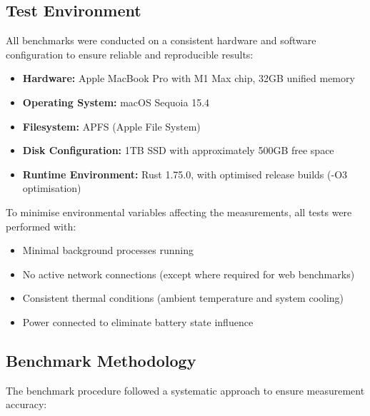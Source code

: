 \subsection{Test Environment}
\label{result:benchmark_on_local_environment:test_environment}

All benchmarks were conducted on a consistent hardware and software configuration to ensure reliable and reproducible results:

\begin{itemize}
  \item \textbf{Hardware:} Apple MacBook Pro with M1 Max chip, 32GB unified memory
  \item \textbf{Operating System:} macOS Sequoia 15.4
  \item \textbf{Filesystem:} APFS (Apple File System)
  \item \textbf{Disk Configuration:} 1TB SSD with approximately 500GB free space
  \item \textbf{Runtime Environment:} Rust 1.75.0, with optimised release builds (-O3 optimisation)
\end{itemize}

To minimise environmental variables affecting the measurements, all tests were performed with:
\begin{itemize}
  \item Minimal background processes running
  \item No active network connections (except where required for web benchmarks)
  \item Consistent thermal conditions (ambient temperature and system cooling)
  \item Power connected to eliminate battery state influence
\end{itemize}

\subsection{Benchmark Methodology}
\label{result:benchmark_on_local_environment:benchmark_methodology}

The benchmark procedure followed a systematic approach to ensure measurement accuracy:

